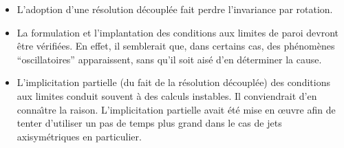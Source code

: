 \begin{itemize}
\item L'adoption d'une r\'esolution d\'ecoupl\'ee fait perdre l'invariance par rotation.
\item La formulation et l'implantation des conditions aux limites de paroi
devront \^etre v\'erifi\'ees. En effet, il semblerait que, dans certains cas, des ph\'enom\`enes
``oscillatoires'' apparaissent, sans qu'il soit ais\'e d'en d\'eterminer la cause.
\item L'implicitation partielle (du fait de la r\'esolution d\'ecoupl\'ee) des
conditions aux limites conduit souvent \`a des calculs instables. Il
conviendrait d'en conna\^\i tre la raison. L'implicitation partielle avait
\'et\'e mise en \oe uvre afin de tenter d'utiliser un pas de temps plus grand
dans le cas de jets axisym\'etriques en particulier.

\end{itemize}
